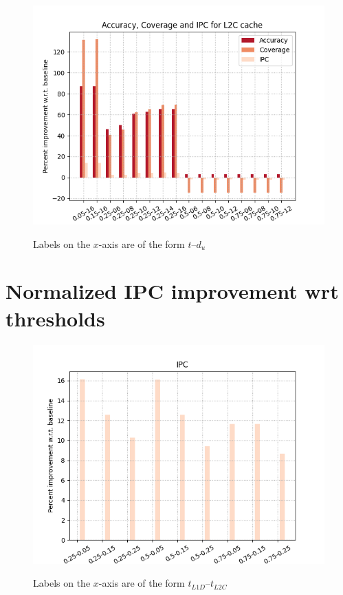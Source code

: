 \documentclass[11pt, swedish, openany]{book}
\begin{document}
\begin{figure}[H]
    \centering
    {\includegraphics[scale = 0.65]{images/L2C.png}}
    \caption{Labels on the $x$-axis are of the form $t$--$d_u$}
    \label{fig:l2c}
\end{figure}

\section{Normalized IPC improvement wrt thresholds}
\label{section:ipc}

\begin{figure}[H]
    \centering
    {\includegraphics[scale = 1]{images/combined_ipcs.png}}
    \caption{Labels on the $x$-axis are of the form $t_{L1D}$--$t_{L2C}$}
    \label{fig:ipcs}
\end{figure}
\end{document}
